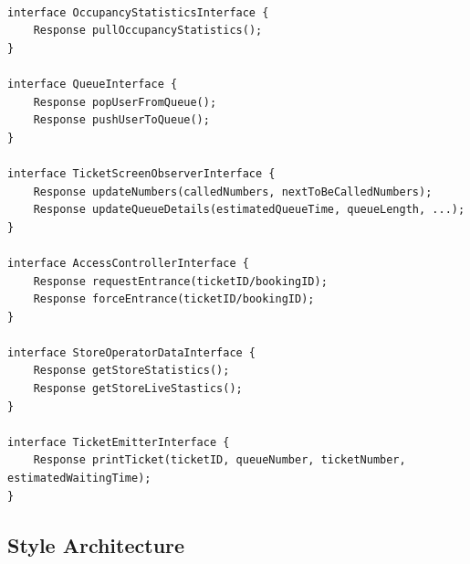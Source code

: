\begin{lstlisting}

interface OccupancyStatisticsInterface {
    Response pullOccupancyStatistics();
}

interface QueueInterface {
    Response popUserFromQueue();
    Response pushUserToQueue();
}

interface TicketScreenObserverInterface {
    Response updateNumbers(calledNumbers, nextToBeCalledNumbers);
    Response updateQueueDetails(estimatedQueueTime, queueLength, ...);
}

interface AccessControllerInterface {
    Response requestEntrance(ticketID/bookingID);
    Response forceEntrance(ticketID/bookingID);
}

interface StoreOperatorDataInterface {
    Response getStoreStatistics();
    Response getStoreLiveStastics();
}

interface TicketEmitterInterface {
    Response printTicket(ticketID, queueNumber, ticketNumber, estimatedWaitingTime);
}

\end{lstlisting}


\subsection{Style Architecture}

